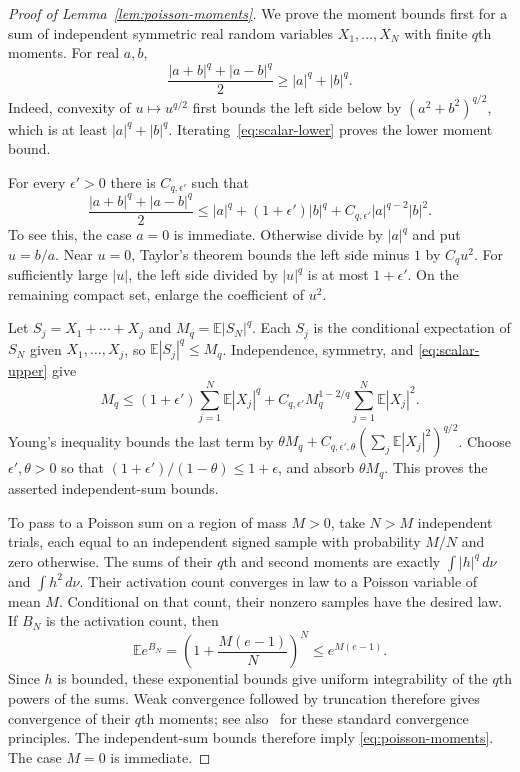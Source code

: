 \documentclass[11pt]{article}
\newcommand{\E}{\mathbb E}
\theoremstyle{remark}
\numberwithin{equation}{section}
\begin{document}
\begin{proof}[Proof of Lemma~\ref{lem:poisson-moments}]
We prove the moment bounds first for a sum of independent symmetric
real random variables $X_1,\ldots,X_N$ with finite $q$th moments.
For real $a,b$,
\begin{equation}\label{eq:scalar-lower}
 \frac{|a+b|^q+|a-b|^q}{2}\ge|a|^q+|b|^q.
\end{equation}
Indeed, convexity of $u\mapsto u^{q/2}$ first bounds the left side
below by $(a^2+b^2)^{q/2}$, which is at least $|a|^q+|b|^q$.
Iterating~\eqref{eq:scalar-lower} proves the lower moment bound.

For every $\epsilon'>0$ there is $C_{q,\epsilon'}$ such that
\begin{equation}\label{eq:scalar-upper}
 \frac{|a+b|^q+|a-b|^q}{2}
 \le |a|^q+(1+\epsilon')|b|^q
    +C_{q,\epsilon'}|a|^{q-2}|b|^2.
\end{equation}
To see this, the case $a=0$ is immediate. Otherwise divide by $|a|^q$
and put $u=b/a$. Near $u=0$, Taylor's theorem bounds the left side
minus $1$ by $C_qu^2$. For sufficiently large $|u|$, the left side
divided by $|u|^q$ is at most $1+\epsilon'$. On the remaining compact
set, enlarge the coefficient of $u^2$.

Let $S_j=X_1+\cdots+X_j$ and $M_q=\E|S_N|^q$. Each $S_j$ is the
conditional expectation of $S_N$ given $X_1,\ldots,X_j$, so
$\E|S_j|^q\le M_q$. Independence, symmetry, and
\eqref{eq:scalar-upper} give
\[
 M_q\le(1+\epsilon')\sum_{j=1}^N\E|X_j|^q
  +C_{q,\epsilon'}M_q^{1-2/q}\sum_{j=1}^N\E|X_j|^2.
\]
Young's inequality bounds the last term by
$\theta M_q+C_{q,\epsilon',\theta}(\sum_j\E|X_j|^2)^{q/2}$.
Choose $\epsilon',\theta>0$ so that
$(1+\epsilon')/(1-\theta)\le1+\epsilon$, and absorb $\theta M_q$.
This proves the asserted independent-sum bounds.

To pass to a Poisson sum on a region of mass $M>0$, take $N>M$
independent trials, each equal to an independent signed sample with
probability $M/N$ and zero otherwise. The sums of their $q$th and
second moments are exactly $\int|h|^q\,d\nu$ and $\int h^2\,d\nu$.
Their activation count converges in law to a Poisson variable of
mean $M$. Conditional on that count, their nonzero samples have the
desired law. If $B_N$ is the activation count, then
\[
 \E e^{B_N}=\left(1+\frac{M(e-1)}N\right)^N\le e^{M(e-1)}.
\]
Since $h$ is bounded, these exponential bounds give uniform
integrability of the $q$th powers of the sums. Weak convergence followed
by truncation therefore gives convergence of their $q$th moments;
see also~\cite[Sections~3.2 and~4.6]{Durrett2019} for these standard
convergence principles. The independent-sum bounds therefore imply
\eqref{eq:poisson-moments}. The case $M=0$ is immediate.
\end{proof}
\end{document}
